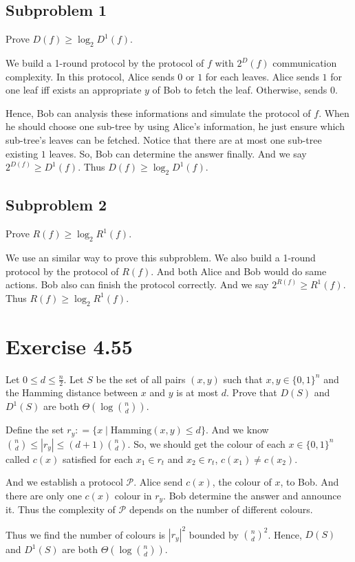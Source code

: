 \documentclass[11pt, fleqn, a4paper]{report}
\begin{document}
\subsection*{Subproblem 1}
Prove $D(f) \geq \log_2{D^1(f)}$.

We build a 1-round protocol by the protocol of $f$ with $2^D(f)$ communication complexity. In this protocol, Alice sends $0$ or $1$ for each leaves. Alice sends $1$ for one leaf iff exists an appropriate $y$ of Bob to fetch the leaf. Otherwise, sends $0$. 

Hence, Bob can analysis these informations and simulate the protocol of $f$. When he should choose one sub-tree by using Alice's information, he just ensure which sub-tree's leaves can be fetched. Notice that there are at most one sub-tree existing $1$ leaves. So, Bob can determine the answer finally. And we say $2^{D(f)} \geq D^1(f)$. Thus $D(f) \geq \log_2{D^1(f)}$.

\subsection*{Subproblem 2}
Prove $R(f) \geq \log_2{R^1(f)}$.

We use an similar way to prove this subproblem. We also build a 1-round protocol by the protocol of $R(f)$. And both Alice and Bob would do same actions. Bob also can finish the protocol correctly. And we say $2^{R(f)} \geq R^1(f)$. Thus $R(f) \geq \log_2{R^1(f)}$.

\section*{Exercise 4.55}
Let $0 \leq d \leq \frac{n}{2}$. Let $S$ be the set of all pairs $(x, y)$ such that $x,y \in \{0,1\}^n$ and the Hamming distance between $x$ and $y$ is at most $d$. Prove that $D(S)$ and $D^1(S)$ are both $\Theta(\log{\binom{n}{d}})$.

Define the set $r_y : = \{x \mid \mathrm{Hamming}(x,y) \leq d\}$. And we know $\binom{n}{d} \leq |r_y| \leq (d + 1)\binom{n}{d}$. So, we should get the colour of each $x \in \{0,1\}^n$ called $c(x)$ satisfied for each $x_1\in r_t$ and $x_2 \in r_t$, $c(x_1) \neq c(x_2)$.

And we establish a protocol $\mathcal{P}$. Alice send $c(x)$, the colour of $x$, to Bob. And there are only one $c(x)$ colour in $r_y$. Bob determine the answer and announce it. Thus the complexity of $\mathcal{P}$ depends on the number of different colours.

Thus we find the number of colours is $|r_y|^2$ bounded by $ \binom{n}{d}^2$. Hence, $D(S)$ and $D^1(S)$ are both $\Theta(\log{\binom{n}{d}})$.
\end{document}
